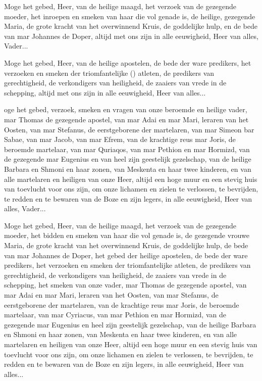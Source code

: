 \documentclass[12pt,twoside,a5paper]{article}
\begin{document}
\begin{halfparskip}
    Moge het gebed, Heer, van de heilige maagd, het verzoek van de gezegende moeder, het inroepen en smeken van haar die vol genade is, de heilige, gezegende Maria, de grote kracht van het overwinnend Kruis, de goddelijke hulp, en de bede van mar Johannes de Doper, altijd met ons zijn in alle eeuwigheid, Heer van alles, Vader...

   Moge het gebed, Heer, van de heilige apostelen, de bede der ware predikers, het verzoeken en smeken der triomfantelijke () atleten, de predikers van gerechtigheid, de verkondigers van heiligheid, de zaaiers van vrede in de schepping, altijd met ons zijn in alle eeuwigheid, Heer van alles...

   oge het gebed, verzoek, smeken en vragen van onze beroemde en heilige vader, mar Thomas de gezegende apostel, van mar Adai en mar Mari, leraren van het Oosten, van mar Stefanus, de eerstgeborene der martelaren, van mar Simeon bar Sabae, van mar Jacob, van mar Efrem, van de krachtige reus mar Joris, de beroemde martelaar, van mar Quriaqos, van mar Pethion en mar Hormizd, van de gezegende mar Eugenius en van heel zijn geestelijk gezelschap, van de heilige Barbara en Shmoni en haar zonen, van Meskenta en haar twee kinderen, en van alle martelaren en heiligen van onze Heer, altijd een hoge muur en een stevig huis van toevlucht voor ons zijn, om onze lichamen en zielen te verlossen, te bevrijden, te redden en te bewaren van de Boze en zijn legers, in alle eeuwigheid, Heer van alles, Vader...
\end{halfparskip}

\begin{halfparskip}
  \fullline
   Moge het gebed, Heer, van de heilige maagd, het verzoek van de gezegende moeder, het bidden en smeken van haar die vol genade is, de gezegende vrouwe Maria, de grote kracht van het overwinnend Kruis, de goddelijke hulp, de bede van mar Johannes de Doper, het gebed der heilige apostelen, de bede der ware predikers, het verzoeken en smeken der triomfantelijke atleten, de predikers van gerechtigheid, de verkondigers van heiligheid, de zaaiers van vrede in de schepping, het smeken van onze vader, mar Thomas de gezegende apostel, van mar Adai en mar Mari, leraren van het Oosten, van mar Stefanus, de eerstgeborene der martelaren, van de krachtige reus mar Joris, de beroemde martelaar, van mar Cyriacus, van mar Pethion en mar Hormizd, van de gezegende mar Eugenius en heel zijn geestelijk gezelschap, van de heilige Barbara en Shmoni en haar zonen, van Meskenta en haar twee kinderen, en van alle martelaren en heiligen van onze Heer, altijd een hoge muur en een stevig huis van toevlucht voor ons zijn, om onze lichamen en zielen te verlossen, te bevrijden, te redden en te bewaren van de Boze en zijn legers, in alle eeuwigheid, Heer van alles...
\end{halfparskip}
\end{document}
